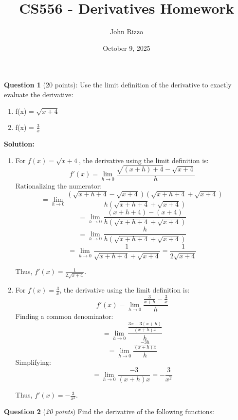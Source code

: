 \documentclass{article}
\title{CS556 - Derivatives Homework}
\author{John Rizzo}
\date{October 9, 2025}
\begin{document}
\maketitle
\noindent
\vspace{1cm}
\textbf{Question 1} (20 points): Use the limit definition of the derivative to exactly evaluate the derivative:

\begin{enumerate}
    \item f(x) = $\sqrt{x+4}$
    \item f(x) = $\frac{3}{x}$
\end{enumerate}

\textbf{Solution:}
\begin{enumerate}
    \item For $f(x) = \sqrt{x+4}$, the derivative using the limit definition is:
    \[
    f'(x) = \lim_{h \to 0} \frac{\sqrt{(x+h)+4} - \sqrt{x+4}}{h}
    \]
    Rationalizing the numerator:
    \[
    = \lim_{h \to 0} \frac{(\sqrt{x+h+4} - \sqrt{x+4})(\sqrt{x+h+4} + \sqrt{x+4})}{h(\sqrt{x+h+4} + \sqrt{x+4})}
    \]
    \[
    = \lim_{h \to 0} \frac{(x+h+4) - (x+4)}{h(\sqrt{x+h+4} + \sqrt{x+4})}
    \]
    \[
    = \lim_{h \to 0} \frac{h}{h(\sqrt{x+h+4} + \sqrt{x+4})}
    \]
    \[
    = \lim_{h \to 0} \frac{1}{\sqrt{x+h+4} + \sqrt{x+4}} = \frac{1}{2\sqrt{x+4}}
    \]

    Thus, $f'(x) = \frac{1}{2\sqrt{x+4}}$.

    \item For $f(x) = \frac{3}{x}$, the derivative using the limit definition is:
    \[
    f'(x) = \lim_{h \to 0} \frac{\frac{3}{x+h} - \frac{3}{x}}{h}
    \]
    Finding a common denominator:
    \[
    = \lim_{h \to 0} \frac{\frac{3x - 3(x+h)}{(x+h)x}}{h}
    \]
    \[
    = \lim_{h \to 0} \frac{\frac{-3h}{(x+h)x}}{h}
    \]
    Simplifying:
    \[
    = \lim_{h \to 0} \frac{-3}{(x+h)x} = -\frac{3}{x^2}
    \]

    Thus, $f'(x) = -\frac{3}{x^2}$.
\end{enumerate}

\vspace{1cm}
\textbf{Question 2} (\textit{20 points}) Find the derivative of the following functions:
\end{document}
